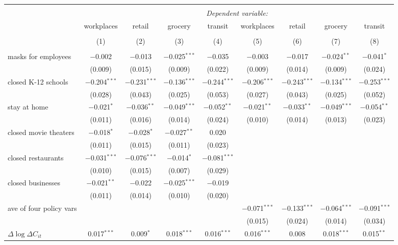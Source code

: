 \begin{tabular}{@{\extracolsep{1pt}}lcccccccc} 
\\[-1.8ex]\hline 
\hline \\[-1.8ex] 
 & \multicolumn{8}{c}{\textit{Dependent variable:}} \\ 
\cline{2-9} 
 & workplaces & retail & grocery & transit & workplaces & retail & grocery & transit \\ 
\\[-1.8ex] & (1) & (2) & (3) & (4) & (5) & (6) & (7) & (8)\\ 
\hline \\[-1.8ex] 
 masks for employees & $-$0.002 & $-$0.013 & $-$0.025$^{***}$ & $-$0.035 & $-$0.003 & $-$0.017 & $-$0.024$^{**}$ & $-$0.041$^{*}$ \\ 
  & (0.009) & (0.015) & (0.009) & (0.022) & (0.009) & (0.014) & (0.009) & (0.024) \\ 
  closed K-12 schools & $-$0.204$^{***}$ & $-$0.231$^{***}$ & $-$0.136$^{***}$ & $-$0.244$^{***}$ & $-$0.206$^{***}$ & $-$0.243$^{***}$ & $-$0.134$^{***}$ & $-$0.253$^{***}$ \\ 
  & (0.028) & (0.043) & (0.025) & (0.053) & (0.027) & (0.043) & (0.025) & (0.052) \\ 
  stay at home & $-$0.021$^{*}$ & $-$0.036$^{**}$ & $-$0.049$^{***}$ & $-$0.052$^{**}$ & $-$0.021$^{**}$ & $-$0.033$^{**}$ & $-$0.049$^{***}$ & $-$0.054$^{**}$ \\ 
  & (0.011) & (0.016) & (0.014) & (0.024) & (0.010) & (0.014) & (0.013) & (0.023) \\ 
  closed movie theaters & $-$0.018$^{*}$ & $-$0.028$^{*}$ & $-$0.027$^{**}$ & 0.020 &  &  &  &  \\ 
  & (0.011) & (0.015) & (0.011) & (0.023) &  &  &  &  \\ 
  closed restaurants & $-$0.031$^{***}$ & $-$0.076$^{***}$ & $-$0.014$^{*}$ & $-$0.081$^{***}$ &  &  &  &  \\ 
  & (0.010) & (0.015) & (0.007) & (0.029) &  &  &  &  \\ 
  closed businesses & $-$0.021$^{**}$ & $-$0.022 & $-$0.025$^{***}$ & $-$0.019 &  &  &  &  \\ 
  & (0.011) & (0.014) & (0.010) & (0.020) &  &  &  &  \\ 
  ave of four policy vars &  &  &  &  & $-$0.071$^{***}$ & $-$0.133$^{***}$ & $-$0.064$^{***}$ & $-$0.091$^{***}$ \\ 
  &  &  &  &  & (0.015) & (0.024) & (0.014) & (0.034) \\ 
  $\Delta \log \Delta C_{it}$ & 0.017$^{***}$ & 0.009$^{*}$ & 0.018$^{***}$ & 0.016$^{***}$ & 0.016$^{***}$ & 0.008 & 0.018$^{***}$ & 0.015$^{**}$ \\ 

\end{tabular}
